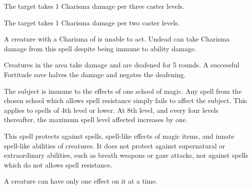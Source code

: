 \spellrng{\rngfar}
\begin{spellhealthy}
  The target takes 1 Charisma damage per three caster levels.
\end{spellhealthy}
\begin{spellblood}
  The target takes 1 Charisma damage per two caster levels.
\end{spellblood}
\begin{spellnotes}
  A creature with a Charisma of  is unable to act. Undead can take Charisma damage from this spell despite being immune to ability damage. 
\end{spellnotes}

\spellrng{\rngclose}
\begin{spelleffect}
  Creatures in the area take damage and are deafened for 5 rounds. A successful Fortitude save halves the damage and negates the deafening.
\end{spelleffect}

\spellrng{\rngclose}
\spelldur{\durshort}
\begin{spelleffect}
  The subject is immune to the effects of one school of magic. Any spell from the chosen school which allows spell resistance simply fails to affect the subject. This applies to spells of 4th level or lower. At 8th level, and every four levels thereafter, the maximum spell level affected increases by one.
\end{spelleffect}
\begin{spellnotes}
   This spell protects against spells, spell-like effects of magic items, and innate spell-like abilities of creatures. It does not protect against supernatural or extraordinary abilities, such as breath weapons or gaze attacks, nor against spells which do not allows spell resistance.
  \par A creature can have only one  effect on it at a time.
\end{spellnotes}

